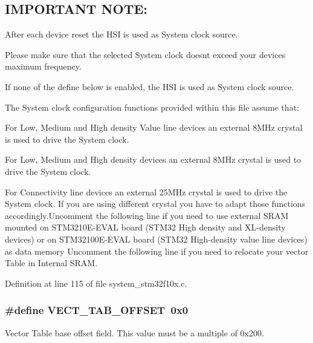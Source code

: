 \subsection*{I\+M\+P\+O\+R\+T\+A\+NT N\+O\+TE\+: }


\begin{DoxyEnumerate}
\item After each device reset the H\+SI is used as System clock source.
\item Please make sure that the selected System clock doesn\textquotesingle{}t exceed your device\textquotesingle{}s maximum frequency.
\item If none of the define below is enabled, the H\+SI is used as System clock source.
\item The System clock configuration functions provided within this file assume that\+:
\begin{DoxyItemize}
\item For Low, Medium and High density Value line devices an external 8\+M\+Hz crystal is used to drive the System clock.
\item For Low, Medium and High density devices an external 8\+M\+Hz crystal is used to drive the System clock.
\item For Connectivity line devices an external 25\+M\+Hz crystal is used to drive the System clock. If you are using different crystal you have to adapt those functions accordingly.\+Uncomment the following line if you need to use external S\+R\+AM mounted on S\+T\+M3210\+E-\/\+E\+V\+AL board (S\+T\+M32 High density and X\+L-\/density devices) or on S\+T\+M32100\+E-\/\+E\+V\+AL board (S\+T\+M32 High-\/density value line devices) as data memory Uncomment the following line if you need to relocate your vector Table in Internal S\+R\+AM. 
\end{DoxyItemize}
\end{DoxyEnumerate}

Definition at line 115 of file system\+\_\+stm32f10x.\+c.

\subsubsection[{\texorpdfstring{V\+E\+C\+T\+\_\+\+T\+A\+B\+\_\+\+O\+F\+F\+S\+ET}{VECT_TAB_OFFSET}}]{\setlength{\rightskip}{0pt plus 5cm}\#define V\+E\+C\+T\+\_\+\+T\+A\+B\+\_\+\+O\+F\+F\+S\+ET~0x0}\hypertarget{group___s_t_m32_f10x___system___private___defines_ga40e1495541cbb4acbe3f1819bd87a9fe}{}\label{group___s_t_m32_f10x___system___private___defines_ga40e1495541cbb4acbe3f1819bd87a9fe}
Vector Table base offset field. This value must be a multiple of 0x200. 

